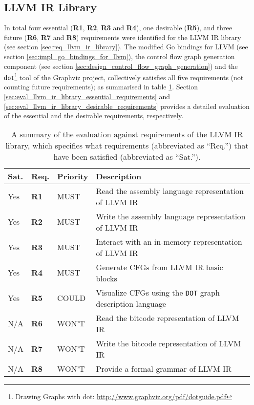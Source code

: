 
\subsection{LLVM IR Library}

In total four essential (\textbf{R1}, \textbf{R2}, \textbf{R3} and \textbf{R4}), one desirable (\textbf{R5}), and three future (\textbf{R6}, \textbf{R7} and \textbf{R8}) requirements were identified for the LLVM IR library (see section \ref{sec:req_llvm_ir_library}). The modified Go bindings for LLVM (see section \ref{sec:impl_go_bindings_for_llvm}), the control flow graph generation component (see section \ref{sec:design_control_flow_graph_generation}) and the \texttt{dot}\footnote{Drawing Graphs with dot: \url{http://www.graphviz.org/pdf/dotguide.pdf}} tool of the Graphviz project, collectively satisfies all five requirements (not counting future requirements); as summarised in table \ref{tbl:eval_summary_of_llvm_ir_library}. Section \ref{sec:eval_llvm_ir_library_essential_requirements} and \ref{sec:eval_llvm_ir_library_desirable_requirements} provides a detailed evaluation of the essential and the desirable requirements, respectively.

\begin{table}[htbp]
	\begin{center}
		\begin{tabular}{|l|l|l|l|}
			\hline
			Sat. & Req. & Priority & Description \\
			\hline
			\rowcolor{light_green_3}
			Yes & \textbf{R1} & MUST & Read the assembly language representation of LLVM IR \\
			\rowcolor{light_green_3}
			Yes & \textbf{R2} & MUST & Write the assembly language representation of LLVM IR \\
			\rowcolor{light_green_3}
			Yes & \textbf{R3} & MUST & Interact with an in-memory representation of LLVM IR \\
			\rowcolor{light_green_3}
			Yes & \textbf{R4} & MUST & Generate CFGs from LLVM IR basic blocks \\
			\hline
			\rowcolor{light_green_3}
			Yes & \textbf{R5} & COULD & Visualize CFGs using the \texttt{DOT} graph description language \\
			\hline
			N/A & \textbf{R6} & WON'T & Read the bitcode representation of LLVM IR \\
			N/A & \textbf{R7} & WON'T & Write the bitcode representation of LLVM IR \\
			N/A & \textbf{R8} & WON'T & Provide a formal grammar of LLVM IR \\
			\hline
		\end{tabular}
	\end{center}
	\caption{A summary of the evaluation against requirements of the LLVM IR library, which specifies what requirements (abbreviated as ``Req.'') that have been satisfied (abbreviated as ``Sat.'').}
	\label{tbl:eval_summary_of_llvm_ir_library}
\end{table}




